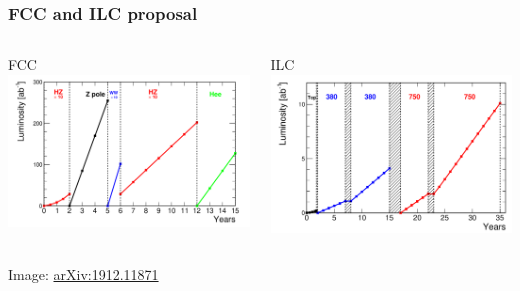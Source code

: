 \documentclass[aspectratio=169]{beamer}
\newcommand{\backupend}{%
   \setcounter{framenumber}{\value{finalframe}}
}
\begin{document}
\begin{frame}
  \frametitle{FCC and ILC proposal}
  \begin{columns}[c]
    \begin{center}
      FCC\\
      \includegraphics[width=\linewidth]{figures/fcc-timeline-withILC.png}
    \end{center}
    \begin{center}
      ILC\\
      \includegraphics[width=\linewidth]{figures/ilc-timeline-withFcc.png}
    \end{center}
  \end{columns}
  \tiny{Image: \href{https://arxiv.org/abs/1912.11871}{arXiv:1912.11871}}\\
\end{frame}

\backupend{}
\end{document}
